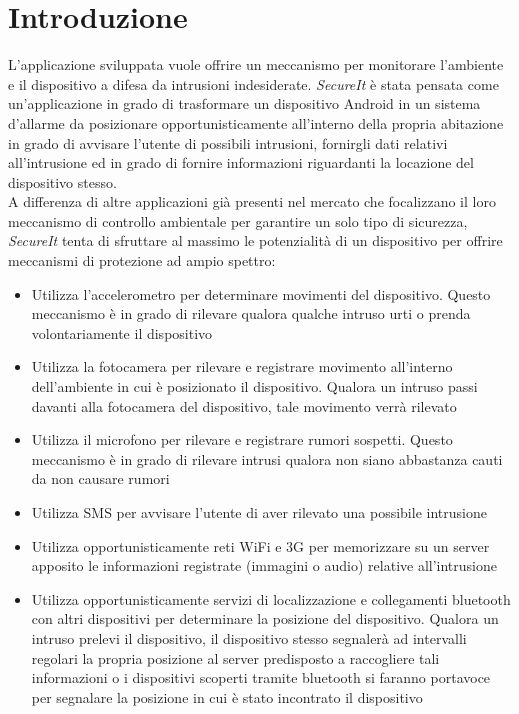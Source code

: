 \section{Introduzione}
L'applicazione sviluppata vuole offrire un meccanismo per monitorare l'ambiente e il dispositivo a difesa da intrusioni indesiderate.
 \textit{SecureIt} è stata pensata come un'applicazione in grado di trasformare un dispositivo Android in un sistema d'allarme da posizionare opportunisticamente all'interno della propria abitazione in grado di avvisare l'utente di possibili intrusioni, fornirgli dati relativi all'intrusione ed in grado di fornire informazioni riguardanti la locazione del dispositivo stesso.\\

A differenza di altre applicazioni già presenti nel mercato che focalizzano il loro meccanismo di controllo ambientale per garantire un solo tipo di sicurezza, \textit{SecureIt} tenta di sfruttare al massimo le potenzialità di un dispositivo per offrire meccanismi di protezione ad ampio spettro:
\begin{itemize}
  \item Utilizza l'accelerometro per determinare movimenti del dispositivo. Questo meccanismo è in grado di rilevare qualora qualche intruso urti o prenda volontariamente il dispositivo
  \item Utilizza la fotocamera per rilevare e registrare movimento all'interno dell'ambiente in cui è posizionato il dispositivo. Qualora un intruso passi davanti alla fotocamera del dispositivo, tale movimento verrà rilevato
  \item Utilizza il microfono per rilevare e registrare rumori sospetti. Questo meccanismo è in grado di rilevare intrusi qualora non siano abbastanza cauti da non causare rumori
  \item Utilizza SMS per avvisare l'utente di aver rilevato una possibile intrusione
  \item Utilizza opportunisticamente reti WiFi e 3G per memorizzare su un server apposito le informazioni registrate (immagini o audio) relative all'intrusione
  \item Utilizza opportunisticamente servizi di localizzazione e collegamenti bluetooth con altri dispositivi per determinare la posizione del dispositivo. Qualora un intruso prelevi il dispositivo, il dispositivo stesso segnalerà ad intervalli regolari la propria posizione al server predisposto a raccogliere tali informazioni o i dispositivi scoperti tramite bluetooth si faranno portavoce per segnalare la posizione in cui è stato incontrato il dispositivo
\end{itemize}

